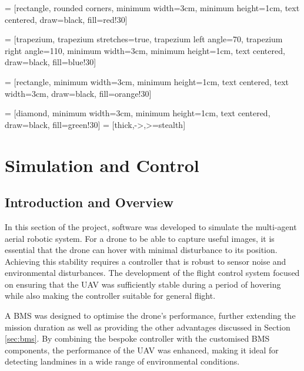 \usetikzlibrary{shapes.geometric, arrows}

 = [rectangle, rounded corners, 
minimum width=3cm, 
minimum height=1cm,
text centered, 
draw=black, 
fill=red!30]

 = [trapezium, 
trapezium stretches=true, %
trapezium left angle=70, 
trapezium right angle=110, 
minimum width=3cm, 
minimum height=1cm, text centered, 
draw=black, fill=blue!30]

 = [rectangle, 
minimum width=3cm, 
minimum height=1cm, 
text centered, 
text width=3cm, 
draw=black, 
fill=orange!30]

 = [diamond, 
minimum width=3cm, 
minimum height=1cm, 
text centered, 
draw=black, 
fill=green!30]
 = [thick,->,>=stealth]

\section{Simulation and Control}
\label{sec:simcontrol}

\subsection{Introduction and Overview}

In this section of the project, software was developed to simulate the multi-agent aerial robotic system. For a drone to be able to capture useful images, it is essential that the drone can hover with minimal disturbance to its position. Achieving this stability requires a controller that is robust to sensor noise and environmental disturbances. The development of the flight control system focused on ensuring that the \gls{UAV} was sufficiently stable during a period of hovering while also making the controller suitable for general flight.

A \gls{BMS} was designed to optimise the drone's performance, further extending the mission duration as well as providing the other advantages discussed in Section \ref{sec:bms}. By combining the bespoke controller with the customised \gls{BMS} components, the performance of the \gls{UAV} was enhanced, making it ideal for detecting landmines in a wide range of environmental conditions.

